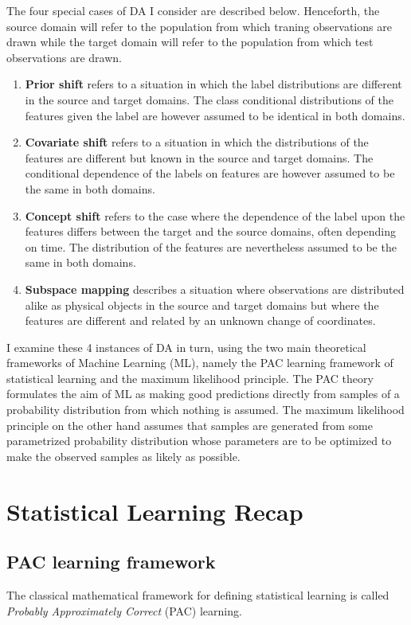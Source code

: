 \documentclass{tufte-handout}
\begin{document}
The four special cases of DA I consider are described below. Henceforth, the source domain will refer to the population from which traning observations are drawn while the target domain will refer to the population from which test observations are drawn.
\begin{enumerate}
  \item \textbf{Prior shift} refers to a situation in which the label distributions are different in the source and target domains. The class conditional distributions of the features given the label are however assumed to be identical in both domains. 
  \item \textbf{Covariate shift} refers to a situation in which the distributions of the features are different but known in the source and target domains. The conditional dependence of the labels on features are however assumed to be the same in both domains.
  \item \textbf{Concept shift} refers to the case where the dependence of the label upon the features differs between the target and the source domains, often depending on time. The distribution of the features are nevertheless assumed to be the same in both domains.
  \item \textbf{Subspace mapping} describes a situation where observations are distributed alike as physical objects in the source and target domains but where the features are different and related by an unknown change of coordinates. 
\end{enumerate}

I examine these 4 instances of DA in turn, using the two main theoretical frameworks of Machine Learning (ML), namely the PAC learning framework of statistical learning and the maximum likelihood principle. 
The PAC theory formulates the aim of ML as making good predictions directly from samples of a probability distribution from which nothing is assumed.
The maximum likelihood principle on the other hand assumes that samples are generated from some parametrized probability distribution whose parameters are to be optimized to make the observed samples as likely as possible.

\section{Statistical Learning Recap}
\subsection{PAC learning framework}
The classical mathematical framework for defining statistical learning is called \textit{Probably Approximately Correct} (PAC) learning. 
\end{document}
